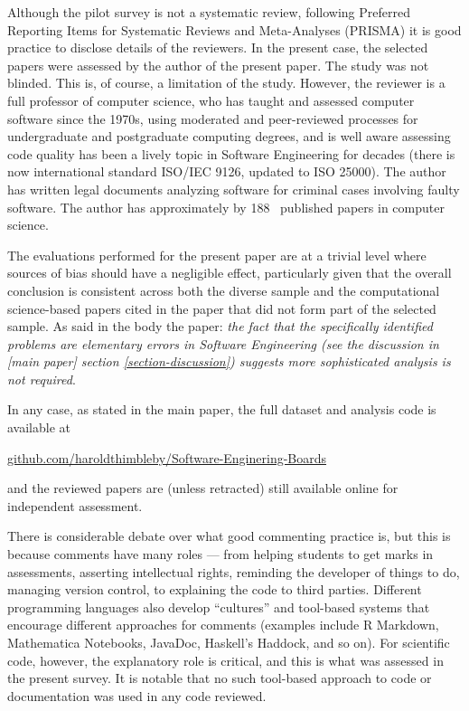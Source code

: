 \documentclass[10pt,a4paper]{article}
\begin{document}
Although the pilot survey is not a systematic review, following Preferred Reporting Items for Systematic Reviews and Meta-Analyses (PRISMA) \cite{prisma} it is good practice to disclose details of the reviewers. In the present case, the selected papers were assessed by the author of the present paper. The study was not blinded. This is, of course, a limitation of the study. However, the reviewer is a full professor of computer science, who has taught and assessed computer software since the 1970s, using moderated and peer-reviewed processes for undergraduate and postgraduate computing degrees, and is well aware assessing code quality has been a lively topic in Software Engineering for decades (there is now international standard ISO/IEC 9126, updated to ISO 25000). The author has written legal documents analyzing software for criminal cases involving faulty software. The author has approximately 
\newcount \papers {} %
\advance \papers by 188 %
\the\papers\ published papers in computer science. 

The evaluations performed for the present paper are at a trivial level where sources of bias should have a negligible effect, particularly given that the overall conclusion is consistent across both the diverse sample and the computational science-based papers cited in the paper that did not form part of the selected sample. As said in the body the paper: \emph{the fact that the specifically identified problems are elementary errors in Software Engineering (see the discussion in \emph{[main paper]\/} section \ref{section-discussion}) suggests more sophisticated analysis is not required}. 

In any case, as stated in the main paper, the full dataset and analysis code is available at \begin{center}\url{github.com/haroldthimbleby/Software-Enginering-Boards}\end{center} and the reviewed papers are (unless retracted) still available online for independent assessment. %

There is considerable debate over what good commenting practice is, but this is because comments have many roles --- from helping students to get marks in assessments, asserting intellectual rights, reminding the developer of things to do, managing version control, to explaining the code to third parties. Different programming languages also develop ``cultures'' and tool-based systems that encourage different approaches for comments (examples include R Markdown, Mathematica Notebooks, JavaDoc, Haskell's Haddock, and so on). For scientific code, however, the explanatory role is critical, and this is what was assessed in the present survey. It is notable that no such tool-based approach to code or documentation was used in any code reviewed.
\end{document}
